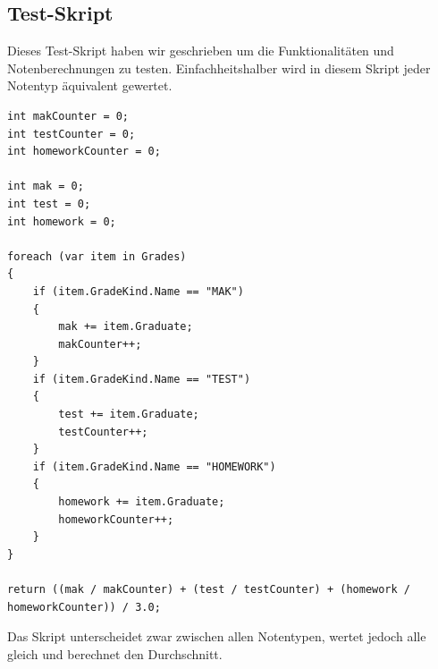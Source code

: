 \newpage
\subsection*{Test-Skript}
Dieses Test-Skript haben wir geschrieben um die Funktionalitäten und Notenberechnungen zu testen.
Einfachheitshalber wird in diesem Skript jeder Notentyp äquivalent gewertet.

\begin{lstlisting}[language={[Sharp]C},caption=CsharpScript-Testscript,label=lst:impl:csc]
int makCounter = 0;
int testCounter = 0;
int homeworkCounter = 0;

int mak = 0;
int test = 0;
int homework = 0;

foreach (var item in Grades)
{
    if (item.GradeKind.Name == "MAK")
    {
        mak += item.Graduate;
        makCounter++;
    }
    if (item.GradeKind.Name == "TEST")
    {
        test += item.Graduate;
        testCounter++;
    }
    if (item.GradeKind.Name == "HOMEWORK")
    {
        homework += item.Graduate;
        homeworkCounter++;
    }
}

return ((mak / makCounter) + (test / testCounter) + (homework / homeworkCounter)) / 3.0;
\end{lstlisting}

Das Skript unterscheidet zwar zwischen allen Notentypen, wertet jedoch alle gleich 
und berechnet den Durchschnitt.
